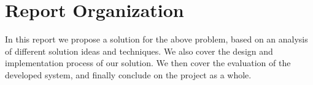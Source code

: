 \section{Report Organization}
In this report we propose a solution for the above problem, based on an analysis of different solution ideas and techniques. We also cover the design and implementation process of our solution. We then cover the evaluation of the developed system, and finally conclude on the project as a whole. 


